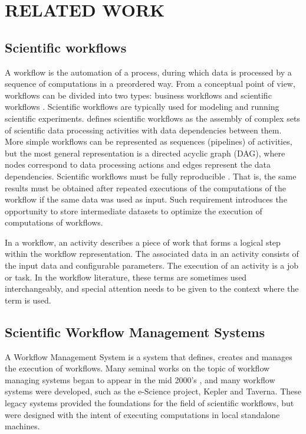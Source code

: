 \chapter{RELATED WORK}
\label{chap:related}
\section{Scientific workflows}
A workflow is the automation of a process, during which data is processed by a sequence of computations in a preordered way. \citep{liu2015survey} From a conceptual point of view, workflows can be divided into two types: business workflows and scientific workflows \citep{hollingsworth1995workflow, taylor2014workflows}. Scientific workflows are typically used for modeling and running scientific experiments. \cite{taylor2014workflows} defines scientific workflows as the assembly of complex sets of scientific data processing activities with data dependencies between them. More simple workflows can be represented as sequences (pipelines) of activities, but the most general representation is a directed acyclic graph (DAG), where nodes correspond to data processing actions and edges represent the data dependencies.  Scientific workflows must be fully reproducible \citep{barker2007scientific}. That is, the same results must be obtained after repeated executions of the computations of the workflow if the same data was used as input. Such requirement introduces the opportunity to store intermediate datasets to optimize the execution of computations of workflows.

In a workflow, an activity describes a piece of work that forms a logical step within the workflow representation.  The associated data in an activity consists of the input data and configurable parameters.  The execution of an activity is a job or task. In the workflow literature, these terms are sometimes used interchangeably, and special attention needs to be given to the context where the term is used.
 
\section{Scientific Workflow Management Systems}
A Workflow Management System is a system that defines, creates and manages the execution of workflows. Many seminal works on the topic of workflow managing systems began to appear in the mid 2000's \citep[e.g.]{yu2005taxonomy, fox2006special, gil2007examining}, and many workflow systems were developed, such as the e-Science project\citep{deelman2009workflows}, Kepler\citep{altintas2004kepler} and Taverna\citep{oinn2006taverna}. These legacy systems provided the foundations for the field of scientific workflows, but were designed with the intent of executing computations in local standalone machines.

